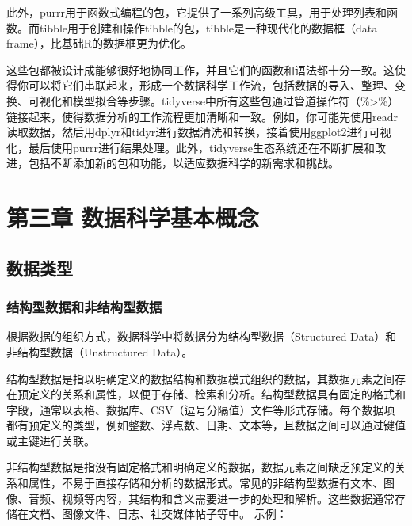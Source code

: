 \documentclass[]{book}
\begin{document}
此外，purrr用于函数式编程的包，它提供了一系列高级工具，用于处理列表和函数。而tibble用于创建和操作tibble的包，tibble是一种现代化的数据框（data frame），比基础R的数据框更为优化。

这些包都被设计成能够很好地协同工作，并且它们的函数和语法都十分一致。这使得你可以将它们串联起来，形成一个数据科学工作流，包括数据的导入、整理、变换、可视化和模型拟合等步骤。tidyverse中所有这些包通过管道操作符（\%\textgreater{}\%）链接起来，使得数据分析的工作流程更加清晰和一致。例如，你可能先使用readr读取数据，然后用dplyr和tidyr进行数据清洗和转换，接着使用ggplot2进行可视化，最后使用purrr进行结果处理。此外，tidyverse生态系统还在不断扩展和改进，包括不断添加新的包和功能，以适应数据科学的新需求和挑战。

\hypertarget{ux7b2cux4e09ux7ae0-ux6570ux636eux79d1ux5b66ux57faux672cux6982ux5ff5}{%
\chapter{第三章 数据科学基本概念}\label{ux7b2cux4e09ux7ae0-ux6570ux636eux79d1ux5b66ux57faux672cux6982ux5ff5}}

\hypertarget{ux6570ux636eux7c7bux578b}{%
\section{数据类型}\label{ux6570ux636eux7c7bux578b}}

\hypertarget{ux7ed3ux6784ux578bux6570ux636eux548cux975eux7ed3ux6784ux578bux6570ux636e}{%
\subsection{结构型数据和非结构型数据}\label{ux7ed3ux6784ux578bux6570ux636eux548cux975eux7ed3ux6784ux578bux6570ux636e}}

根据数据的组织方式，数据科学中将数据分为结构型数据（Structured Data）和非结构型数据（Unstructured Data）。

结构型数据是指以明确定义的数据结构和数据模式组织的数据，其数据元素之间存在预定义的关系和属性，以便于存储、检索和分析。结构型数据具有固定的格式和字段，通常以表格、数据库、CSV（逗号分隔值）文件等形式存储。每个数据项都有预定义的类型，例如整数、浮点数、日期、文本等，且数据之间可以通过键值或主键进行关联。

非结构型数据是指没有固定格式和明确定义的数据，数据元素之间缺乏预定义的关系和属性，不易于直接存储和分析的数据形式。常见的非结构型数据有文本、图像、音频、视频等内容，其结构和含义需要进一步的处理和解析。这些数据通常存储在文档、图像文件、日志、社交媒体帖子等中。
示例：
\end{document}
